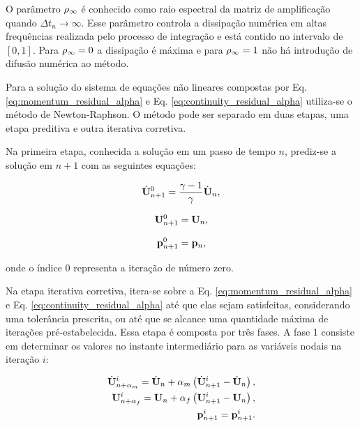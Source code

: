 \documentclass[tese_patricia]{subfiles}%
\begin{document}
O parâmetro $\rho_\infty$ é conhecido como raio espectral da matriz de amplificação quando $\Delta t_{n} \rightarrow \infty$. Esse parâmetro controla a dissipação numérica em altas frequências realizada pelo processo de integração e está contido no intervalo de $[0,1]$. Para $\rho_\infty = 0$ a dissipação é máxima e para $\rho_\infty = 1$ não há introdução de difusão numérica ao método.

Para a solução do sistema de equações não lineares compostas por Eq. \eqref{eq:momentum_residual_alpha} e Eq. \eqref{eq:continuity_residual_alpha} utiliza-se o método de Newton-Raphson. O método pode ser separado em duas etapas, uma etapa preditiva e outra iterativa corretiva.

Na primeira etapa, conhecida a solução em um passo de tempo $n$, prediz-se a solução em $n+1$ com as seguintes equações:

\begin{align}
\dot{\mathbf{U}}_{n+1}^{0} = \frac{\gamma-1}{\gamma}\dot{\mathbf{U}}_{n} \label{eq:Pred1},
\end{align}

\begin{align}
\mathbf{U}_{n+1}^{0} = \mathbf{U}_{n}, \label{eq:Pred2}
\end{align}

\begin{align}
\mathbf{p}_{n+1}^{0} = \mathbf{p}_{n},\label{eq:Pred3}
\end{align}

\noindent onde o índice $0$ representa a iteração de número zero. 

Na etapa iterativa corretiva, itera-se sobre a Eq. \eqref{eq:momentum_residual_alpha} e Eq. \eqref{eq:continuity_residual_alpha} até que elas sejam satisfeitas, considerando uma tolerância prescrita, ou até que se alcance uma quantidade máxima de iterações pré-estabelecida. Essa etapa é composta por três fases. A fase 1 consiste em determinar os valores no instante intermediário para as variáveis nodais na iteração $i$:

\begin{align}
\dot{\mathbf{U}}_{n+\alpha_m}^{i} = \dot{\mathbf{U}}_n + \alpha_m \left( \dot{\mathbf{U}}_{n+1}^{i} - \dot{\mathbf{U}}_n \right), \label{eq:approx_accelerationI}\\
\mathbf{U}_{n+\alpha_f}^{i} = \mathbf{U}_n + \alpha_f \left( \mathbf{U}_{n+1}^{i} - \mathbf{U}_n \right), \label{eq:approx_velocityI}\\
\mathbf{p}_{n+1}^{i} = \mathbf{p}_{n+1}^{i} \label{eq:approx_pressI}.
\end{align}
\end{document}
